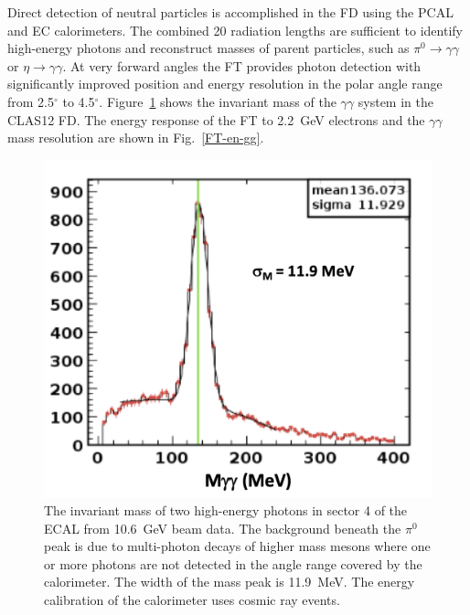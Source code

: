 \documentclass[final,3p,twocolumn]{elsarticle}
\begin{document}
Direct detection of neutral particles is accomplished in the FD using the PCAL and EC calorimeters. The combined
20 radiation lengths are sufficient to identify high-energy photons and reconstruct masses of parent particles, such
as $\pi^0\to \gamma \gamma$  or $\eta \to \gamma \gamma$. At very forward angles the FT provides photon
detection with significantly improved position and energy resolution in the polar angle range from 2.5$^\circ$ to
4.5$^\circ$. Figure~\ref{gg-ecal} shows the invariant mass of the $\gamma\gamma$ system in the CLAS12 FD.
The energy response of the FT to 2.2~GeV electrons and the $\gamma \gamma$ mass resolution are shown in
Fig.~\ref{FT-en-gg}. 

\begin{figure}[tp!]
\centerline{\includegraphics[width=0.95\columnwidth]{ECAL-2g-mass-fit.png}}
\caption{The invariant mass of two high-energy photons in sector 4 of the ECAL from 10.6~GeV beam data. The
  background beneath the $\pi^0$ peak is due to multi-photon decays of higher mass mesons where one or more
  photons are not detected in the angle range covered by the calorimeter. The width of the mass peak is 11.9~MeV.
  The energy calibration of the calorimeter uses cosmic ray events.}
\label{gg-ecal}

\end{figure}
\end{document}
